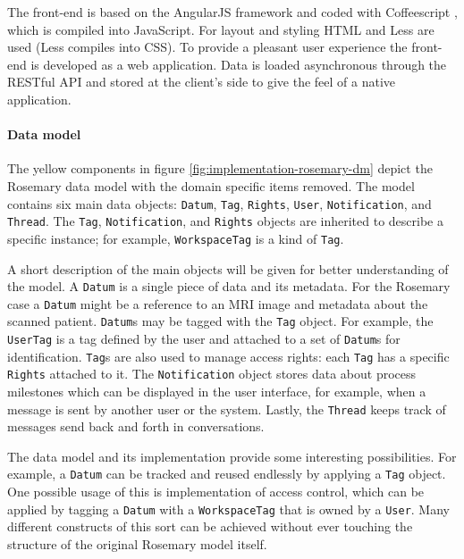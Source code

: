 The front-end is based on the AngularJS \cite{angular} framework and coded with Coffeescript \cite{coffeescript}, which is compiled into JavaScript.
For layout and styling HTML and Less \cite{less} are used (Less compiles into CSS).
To provide a pleasant user experience the front-end is developed as a web application. 
Data is loaded asynchronous through the RESTful API and stored at the client's side to give the feel of a native application.


\paragraph{Data model}
The yellow components in figure \ref{fig:implementation-rosemary-dm} depict the Rosemary data model with the domain specific items removed. 
The model contains six main data objects: {\tt Datum}, {\tt Tag}, {\tt Rights}, {\tt User}, {\tt Notification}, and {\tt Thread}.
The {\tt Tag}, {\tt Notification}, and {\tt Rights} objects are inherited to describe a specific instance; for example, {\tt WorkspaceTag} is a kind of {\tt Tag}.

A short description of the main objects will be given for better understanding of the model.
A {\tt Datum} is a single piece of data and its metadata. For the Rosemary case a {\tt Datum} might be a reference to an MRI image and metadata about the scanned patient. 
{\tt Datum}s may be tagged with the {\tt Tag} object.  For example, the {\tt UserTag} is a tag defined by the user and attached to a set of {\tt Datum}s for identification.
{\tt Tag}s are also used to manage access rights: each {\tt Tag} has a specific {\tt Rights} attached to it.
The {\tt Notification} object stores data about process milestones which can be displayed in the user interface, for example, when a message is sent by another user or the system.
Lastly, the {\tt Thread} keeps track of messages send back and forth in conversations.

The data model and its implementation provide some interesting possibilities.
For example, a {\tt Datum} can be tracked and reused endlessly by applying a {\tt Tag} object.
One possible usage of this is implementation of access control, which can be applied by tagging a {\tt Datum} with a {\tt WorkspaceTag} that is owned by a {\tt User}.
Many different constructs of this sort can be achieved without ever touching the structure of the  original Rosemary model itself.
